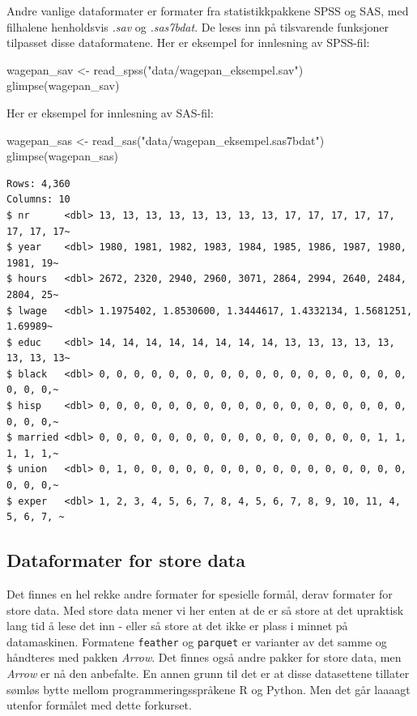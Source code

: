 \documentclass[
  norsk,
  letterpaper,
  DIV=11,
  numbers=noendperiod]{scrreprt}
\newenvironment{Shaded}{\begin{snugshade}}{\end{snugshade}}
\newcommand{\FunctionTok}[1]{\textcolor[rgb]{0.28,0.35,0.67}{#1}}
\newcommand{\NormalTok}[1]{\textcolor[rgb]{0.00,0.23,0.31}{#1}}
\newcommand{\OtherTok}[1]{\textcolor[rgb]{0.00,0.23,0.31}{#1}}
\newcommand{\StringTok}[1]{\textcolor[rgb]{0.13,0.47,0.30}{#1}}
\theoremstyle{definition}
\theoremstyle{remark}
\begin{document}
Andre vanlige dataformater er formater fra statistikkpakkene SPSS og
SAS, med filhalene henholdsvis \emph{.sav} og \emph{.sas7bdat}. De leses
inn på tilsvarende funksjoner tilpasset disse dataformatene. Her er
eksempel for innlesning av SPSS-fil:

\begin{Shaded}
\begin{Highlighting}[]
\NormalTok{wagepan\_sav }\OtherTok{\textless{}{-}} \FunctionTok{read\_spss}\NormalTok{(}\StringTok{"data/wagepan\_eksempel.sav"}\NormalTok{)}
\FunctionTok{glimpse}\NormalTok{(wagepan\_sav)}
\end{Highlighting}
\end{Shaded}

Her er eksempel for innlesning av SAS-fil:

\begin{Shaded}
\begin{Highlighting}[]
\NormalTok{wagepan\_sas }\OtherTok{\textless{}{-}} \FunctionTok{read\_sas}\NormalTok{(}\StringTok{"data/wagepan\_eksempel.sas7bdat"}\NormalTok{)}
\FunctionTok{glimpse}\NormalTok{(wagepan\_sas)}
\end{Highlighting}
\end{Shaded}

\begin{verbatim}
Rows: 4,360
Columns: 10
$ nr      <dbl> 13, 13, 13, 13, 13, 13, 13, 13, 17, 17, 17, 17, 17, 17, 17, 17~
$ year    <dbl> 1980, 1981, 1982, 1983, 1984, 1985, 1986, 1987, 1980, 1981, 19~
$ hours   <dbl> 2672, 2320, 2940, 2960, 3071, 2864, 2994, 2640, 2484, 2804, 25~
$ lwage   <dbl> 1.1975402, 1.8530600, 1.3444617, 1.4332134, 1.5681251, 1.69989~
$ educ    <dbl> 14, 14, 14, 14, 14, 14, 14, 14, 13, 13, 13, 13, 13, 13, 13, 13~
$ black   <dbl> 0, 0, 0, 0, 0, 0, 0, 0, 0, 0, 0, 0, 0, 0, 0, 0, 0, 0, 0, 0, 0,~
$ hisp    <dbl> 0, 0, 0, 0, 0, 0, 0, 0, 0, 0, 0, 0, 0, 0, 0, 0, 0, 0, 0, 0, 0,~
$ married <dbl> 0, 0, 0, 0, 0, 0, 0, 0, 0, 0, 0, 0, 0, 0, 0, 0, 1, 1, 1, 1, 1,~
$ union   <dbl> 0, 1, 0, 0, 0, 0, 0, 0, 0, 0, 0, 0, 0, 0, 0, 0, 0, 0, 0, 0, 0,~
$ exper   <dbl> 1, 2, 3, 4, 5, 6, 7, 8, 4, 5, 6, 7, 8, 9, 10, 11, 4, 5, 6, 7, ~
\end{verbatim}

\subsection{Dataformater for store
data}\label{dataformater-for-store-data}

Det finnes en hel rekke andre formater for spesielle formål, derav
formater for store data. Med store data mener vi her enten at de er så
store at det upraktisk lang tid å lese det inn - eller så store at det
ikke er plass i minnet på datamaskinen. Formatene \texttt{feather} og
\texttt{parquet} er varianter av det samme og håndteres med pakken
\emph{Arrow}. Det finnes også andre pakker for store data, men
\emph{Arrow} er nå den anbefalte. En annen grunn til det er at disse
datasettene tillater sømløs bytte mellom programmeringsspråkene R og
Python. Men det går laaaagt utenfor formålet med dette forkurset.
\end{document}
